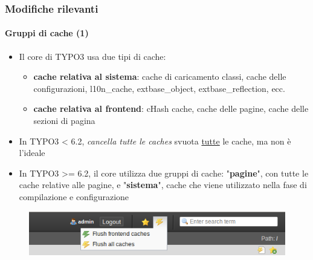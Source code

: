 
\begin{frame}[fragile]
	\frametitle{Modifiche rilevanti}
	\framesubtitle{Gruppi di cache (1)}

	\begin{itemize}
		\item Il core di TYPO3 usa due tipi di cache:

			\begin{itemize}
				\item \textbf{cache relativa al sistema}:
				cache di caricamento classi, cache delle configurazioni, l10n\_cache, extbase\_object, extbase\_reflection, ecc.
				\item \textbf{cache relativa al frontend}:
				cHash cache, cache delle pagine, cache delle sezioni di pagina
			\end{itemize}

		\item In TYPO3 < 6.2, \textit{cancella tutte le caches} svuota \underline{tutte} le cache, ma non è l'ideale

		\item In TYPO3 >= 6.2, il core utilizza due gruppi di cache:\newline
			"\textbf{pagine}", con tutte le cache relative alle pagine, e "\textbf{sistema}", cache che viene utilizzato nella fase di compilazione e configurazione

	\end{itemize}

	\begin{figure}
		\includegraphics[width=0.5\linewidth]{Images/InDepthChanges/CacheGroups.png}
	\end{figure}

\end{frame}


